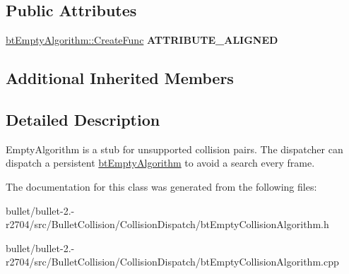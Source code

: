 \subsection*{Public Attributes}
\begin{DoxyCompactItemize}
\item 
\hypertarget{classbt_empty_algorithm_ad58614c761982eb609e336286be4f018}{\hyperlink{structbt_empty_algorithm_1_1_create_func}{bt\+Empty\+Algorithm\+::\+Create\+Func} {\bfseries A\+T\+T\+R\+I\+B\+U\+T\+E\+\_\+\+A\+L\+I\+G\+N\+E\+D}}\label{classbt_empty_algorithm_ad58614c761982eb609e336286be4f018}

\end{DoxyCompactItemize}
\subsection*{Additional Inherited Members}


\subsection{Detailed Description}
Empty\+Algorithm is a stub for unsupported collision pairs. The dispatcher can dispatch a persistent \hyperlink{classbt_empty_algorithm}{bt\+Empty\+Algorithm} to avoid a search every frame. 

The documentation for this class was generated from the following files\+:\begin{DoxyCompactItemize}
\item 
bullet/bullet-\/2.-\/r2704/src/\+Bullet\+Collision/\+Collision\+Dispatch/bt\+Empty\+Collision\+Algorithm.\+h\item 
bullet/bullet-\/2.-\/r2704/src/\+Bullet\+Collision/\+Collision\+Dispatch/bt\+Empty\+Collision\+Algorithm.\+cpp\end{DoxyCompactItemize}
